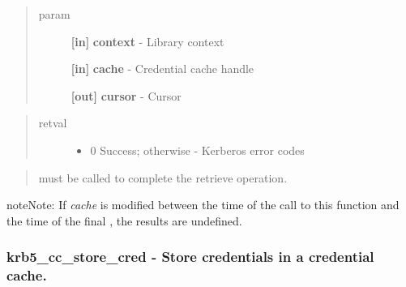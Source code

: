 \documentclass[letterpaper,10pt,english]{sphinxmanual}
\begin{document}
\begin{fulllineitems}
\label{appdev/refs/api/krb5_cc_start_seq_get:c.krb5_cc_start_seq_get}
\end{fulllineitems}

\begin{quote}\begin{description}
\item[{param}] \leavevmode
\textbf{{[}in{]}} \textbf{context} - Library context

\textbf{{[}in{]}} \textbf{cache} - Credential cache handle

\textbf{{[}out{]}} \textbf{cursor} - Cursor

\end{description}\end{quote}
\begin{quote}\begin{description}
\item[{retval}] \leavevmode\begin{itemize}
\item {} 
0   Success; otherwise - Kerberos error codes

\end{itemize}

\end{description}\end{quote}
\begin{quote}

{\hyperref[appdev/refs/api/krb5_cc_end_seq_get:c.krb5_cc_end_seq_get]{}} must be called to complete the retrieve operation.
\end{quote}

\begin{notice}{note}{Note:}
If \emph{cache} is modified between the time of the call to this function and the time of the final {\hyperref[appdev/refs/api/krb5_cc_end_seq_get:c.krb5_cc_end_seq_get]{}} , the results are undefined.
\end{notice}


\subsubsection{krb5\_cc\_store\_cred -  Store credentials in a credential cache.}
\label{appdev/refs/api/krb5_cc_store_cred:krb5-cc-store-cred-store-credentials-in-a-credential-cache}\label{appdev/refs/api/krb5_cc_store_cred::doc}
\end{document}

